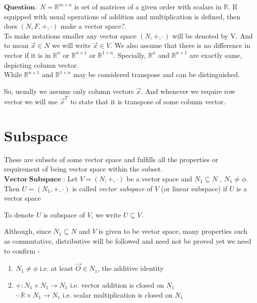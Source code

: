 \documentclass{article}
\begin{document}
$\boldsymbol{Question}.~~N = \mathbb{R}^{m\times n}$ is set of matrices of a given order with scalars in $\mathbb{R}$. If equipped with usual operations of addition and multiplication is defined, then does $(N,F,+,\cdot)$ make a vector space?.\\

To make notations smaller any vector space $(N,+,\cdot)$ will be denoted by V. And to mean $\vec{x} \in N$ we will write $\vec{x} \in V$. We also assume that there is no difference in vector if it is in $\mathbb{R}^n$ or $\mathbb{R}^{n \times 1}$ or $\mathbb{R}^{1 \times n}$. Specially, $\mathbb{R}^n$ and $\mathbb{R}^{n \times 1}$ are exactly same, depicting column vector.\\

While $\mathbb{R}^{n \times 1}$ and $\mathbb{R}^{1 \times n}$ may be considered transpose and can be distinguished. \par
So, usually we assume only column vectors $\vec{x}$. And whenever we require row vector we will use $\vec{x}^T$ to state that it is transpose of some column vector.


\section{Subspace}

These are subsets of some vector space and fulfills all the properties or requirement of being vector space within the subset.\\

$\boldsymbol{Vector ~ Subspace}$ : Let $V = (N, +,\cdot)$ be a vector space and $N_1 \subseteq N$ , $N_1 \neq \phi$. Then $U = (N_1,+,\cdot)$ is called \textit{vector subspace} of $V$ (or linear subspace) if $U$ is a vector space\par
To denote $U$ is subspace of $V$, we write $U \subseteq V$.

Although, since $N_1 \subseteq N$ and $V$ is given to be vector space, many properties such as commutative, distributive will be followed and need not be proved yet we need to confirm -
\begin{enumerate}
    \item $N_1 \neq \phi$ i.e. at least $\vec{O} \in N_1$, the additive identity
    \item $+: N_1 \times N_1 \rightarrow N_1$ i.e. vector addition is closed on $N_1$ \\
          $\cdot: \mathbb{R} \times N_1 \rightarrow N_1$ i.e. scalar multiplication is closed on $N_1$
\end{enumerate}
\end{document}
